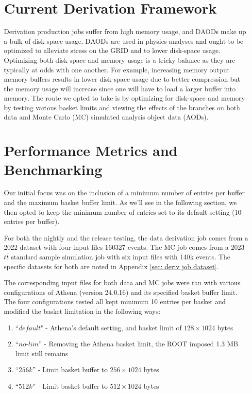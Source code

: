 \section{Current Derivation Framework}
Derivation production jobs suffer from high memory usage, and DAODs make up a bulk of disk-space usage. 
DAODs are used in physics analyses and ought to be optimized to alleviate stress on the GRID and to lower disk-space usage. 
Optimizing both disk-space and memory usage is a tricky balance as they are typically at odds with one another. 
For example, increasing memory output memory buffers results in lower disk-space usage due to better compression but the memory usage will increase since one will have to load a larger buffer into memory. 
The route we opted to take is by optimizing for disk-space and memory by testing various basket limits and viewing the effects of the branches on both data and Monte Carlo (MC) simulated analysis object data (AODs).

\section{Performance Metrics and Benchmarking}

Our initial focus was on the inclusion of a minimum number of entries per buffer and the maximum basket buffer limit.
As we'll see in the following section, we then opted to keep the minimum number of entries set to its default setting (10 entries per buffer). 


For both the nightly and the release testing, the data derivation job comes from a 2022 dataset with four input files 160327 events. 
The MC job comes from a 2023 $t\bar{t}$ standard sample simulation job with six input files with 140k events. 
The specific datasets for both are noted in Appendix \ref{sec: deriv job dataset}.

The corresponding input files for both data and MC jobs were ran with various configurations of Athena (version 24.0.16) and its specified basket buffer limit. 
The four configurations tested all kept minimum 10 entries per basket and modified the basket limitation in the following ways: 

\begin{enumerate}
    \item ``$\textit{default}$" - Athena's default setting, and basket limit of $128\times1024$ bytes
    \item ``$\textit{no-lim}$'' - Removing the Athena basket limit, the ROOT imposed 1.3 MB limit still remains
    \item ``$\textit{256k}$'' - Limit basket buffer to $256\times1024$ bytes
    \item ``$\textit{512k}$'' - Limit basket buffer to $512\times1024$ bytes
\end{enumerate}

